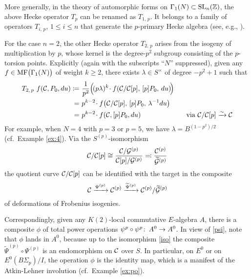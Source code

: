 \documentclass{gtpart}
\theoremstyle{definition}
\theoremstyle{remark}
\def\co{\colon\thinspace}
\newcommand{\mb}[1]{\mathbb{#1}}
\newcommand{\CC}{{\cal C}}
\newcommand{\CG}{{\cal G}}
\newcommand{\BZ}{{\mb Z}}
\newcommand{\MF}{{\rm MF}}
\newcommand{\f}{\phi}
\newcommand{\G}{\Gamma}
\renewcommand{\l}{\lambda}
\newcommand{\ce}{\coloneqq}
\renewcommand{\=}{\approx}
\renewcommand{\-}{\sim}
\newcommand{\SL}{{\rm SL}}
\numberwithin{equation}{section}
\begin{document}
More generally, in the theory of automorphic forms on 
$\G_1(N) \subset \SL_n(\BZ)$, the above Hecke operator $T_p$ can be renamed as 
$T_{1,\,p}$.  It belongs to a family of operators $T_{i,\,p}$, $1 \leq i \leq n$ 
that generate the $p$-primary Hecke algebra (see, e.g., 
\cite[Theorems 3.20 and 3.35]{AF}).  

For the case $n = 2$, the other Hecke operator $T_{2,\,p}$ arises from the 
isogeny of multiplication by $p$, whose kernel is the degree-$p^2$ subgroup 
consisting of the $p$-torsion points.  Explicitly (again with the subscripts 
``$N$'' suppressed), given any $f \in \MF\big(\G_1(N)\big)$ of weight 
$k \geq 2$, there exists $\l \in S^\times$ of degree $-p^2 + 1$ such that 
\begin{equation}
 \label{T2p}
 \begin{split}
  T_{2,\,p}~f(\CC, P_0, du) \ce & ~ \frac{1}{p^2} \Big(\! (p \l)^k \!\cdot 
                                  f\!\left(\CC/\CC[p], \, [p] P_0, \, 
                                  du\right) \!\!\Big) \\
                              = & ~ p^{k - 2} \!\cdot f\!\left(\CC/\CC[p], \, 
                                  [p] P_0, \, \l^{-1} du\right) \\
                              = & ~ p^{k - 2} \!\cdot f(\CC, [p] P_0, du) 
                                  \qquad\qquad\qquad~~ \text{via 
                                  $\CC/\CC[p] \xrightarrow{\sim} \CC$} 
 \end{split}
\end{equation}
For example, when $N = 4$ with $p = 3$ or $p = 5$, we have 
$\lambda = B^{(1 - p^2)/2}$ (cf.~Example \ref{ex:4}).  Via the 
$S^{(p)}$-isomorphism 
\begin{equation}
 \label{iso}
 \CC/\CC[p] \cong \frac{\CC/\CG^{(p)}}{\CC[p]/\CG^{(p)}} \eqqcolon 
 \frac{\CC^{(p)}}{\widetilde{\CG}^{(p)}} 
\end{equation}
the quotient curve $\CC/\CC[p]$ can be identified with the target in the 
composite 
\[
 \CC \xrightarrow{\Psi^{(p)}} \CC^{(p)} \xrightarrow{\widetilde{\Psi}^{(p)}} 
 \CC^{(p)}/\widetilde{\CG}^{(p)} 
\]
of deformations of Frobenius isogenies.  

Correspondingly, given any $K(2)$-local commutative $E$-algebra $A$, there is 
a composite $\f$ of total power operations 
$\psi^p \circ \psi^p \co A^0 \to A^0$.  In view of \eqref{psi}, note that $\phi$ 
lands in $A^0$, because up to the isomorphism \eqref{iso} the composite 
$\widetilde{\Psi}^{(p)} \circ \Psi^{(p)}$ is an endomorphism on $\CC$ over $S$.  
In particular, on $E^0$ or on $E^0(B\Sigma_p) / I$, the operation $\phi$ is the 
identity map, which is a manifest of the Atkin-Lehner involution (cf.~Example 
\ref{ex:po}).  
\end{document}

